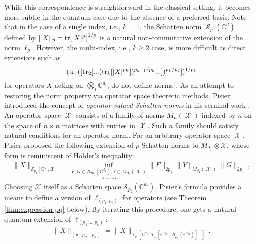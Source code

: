 \documentclass[11pt]{article}
\newcommand{\1}{\ensuremath{\mathbbm{1}}}
\theoremstyle{newdefinition}
\theoremstyle{newplain}
\theoremstyle{myplain}
\DeclareMathOperator{\cS}{\mathcal{S}}
\DeclareMathOperator{\cX}{\mathcal{X}}
\begin{document}
While this correspondence is straightforward in the classical setting, it becomes more subtle in the quantum case due to the absence of a preferred basis. Note that in the case of a single index, i.e., $k=1$, the Schatten norm $\cS_p(\mathbb{C}^d)$ defined by $\| X \|_{p} = \tr[|X|^p]^{1/p}$ is a natural non-commutative extension of the norm $\ell_p$. However, the multi-index, i.e., $k \geq 2$ case, is more difficult as direct extensions such as  
\[
 (\tr_1([\tr_2[...(\tr_k[|X|^{p_k}])^{{p_{k-1}/p_k}}...])^{{p_1/p_2}}])^{{1/p_1}}
\]
for operators \(X\) acting on \( \bigotimes_{i}\mathbb{C}^{d_i}\), do not define norms \cite{Devetak.2006}. As an attempt to restoring the norm property via operator space theoretic methods, Pisier introduced the concept of \textit{operator-valued Schatten norms} in his seminal work \cite{Pisier.1993}. 
An operator space $\cX$ consists of a family of norms $M_{n}(\cX)$ indexed by $n$ on the space of $n \times n$ matrices with entries in $\cX$. Such a family should satisfy natural conditions for an operator norm.
For an arbitrary operator space $\cX$, Pisier proposed the following extension of $p$-Schatten norms to $M_{d_1}\otimes \mathcal{X}$, whose form is reminiscent of H\"{o}lder's inequality: 
\begin{align}
    \|X\|_{\mathcal{S}_{p_1}[\mathbb{C}^{d_1},\mathcal{X}]}= \inf_{\underset{X=FYG}{F,G\in \mathcal{S}_{2p_1}(\mathbb{C}^{d_1}), Y\in M_{d_1}(\cX)}}\|F\|_{2p_1}\|Y\|_{M_{d_1}(\cX)}\|G\|_{2p_1}\,,
\end{align}
Choosing $\mathcal{X}$ itself as a Schatten space $\mathcal{S}_{p_2}(\mathbb{C}^{d_2})$, Pisier's formula provides a means to define a version of $\ell_{(p_1,p_2)}$ for operators (see Theorem \ref{thm:expression-pq} below). By iterating this procedure, one gets a natural quantum extension of $\ell_{(p_1,\dots\,p_k)}$:
\begin{align}
    \|X\|_{(p_1,p_2\cdots\, p_n)} = \|X\|_{\mathcal{S}_{p_1}[ \mathbb{C}^{d_1}, \mathcal{S}_{p_2}[ \mathbb{C}^{d_2} \cdots \, \mathcal{S}_{p_n}(\mathbb{C}^{d_n})]\cdots ]}\,.
\end{align}
\end{document}
